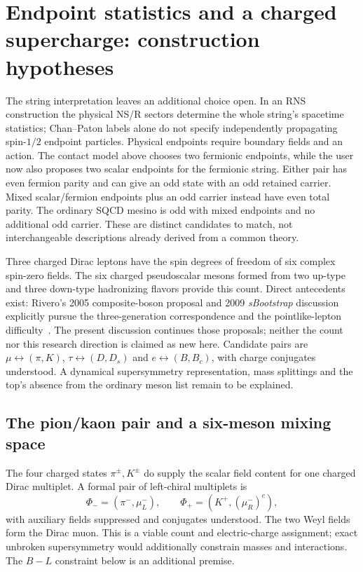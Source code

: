 \section{Endpoint statistics and a charged supercharge: construction hypotheses}
\label{sec:susy-dictionary}
The string interpretation leaves an additional choice open. In an RNS
construction the physical NS/R sectors determine the whole string's spacetime
statistics; Chan--Paton labels alone do not specify independently propagating
spin-$1/2$ endpoint particles. Physical endpoints require boundary fields and
an action. The contact model above chooses two fermionic endpoints, while the
user now also proposes two scalar endpoints for the fermionic string. Either
pair has even fermion parity and can give an odd state with an odd retained
carrier. Mixed scalar/fermion endpoints plus an odd carrier instead have even
total parity. The ordinary SQCD mesino is odd with mixed endpoints and no
additional odd carrier. These are distinct candidates to match, not
interchangeable descriptions already derived from a common theory.

Three charged Dirac leptons have the spin degrees of freedom of six complex
spin-zero fields. The six charged pseudoscalar mesons formed from two up-type
and three down-type hadronizing flavors provide this count. Direct antecedents
exist: Rivero's 2005 composite-boson proposal and 2009 \emph{sBootstrap}
discussion explicitly pursue the three-generation correspondence and the
pointlike-lepton difficulty~\cite{Rivero2005,Rivero2009}. The present discussion
continues those proposals; neither the count nor this research direction is
claimed as new here. Candidate pairs are
$\mu\leftrightarrow(\pi,K)$, $\tau\leftrightarrow(D,D_s)$ and
$e\leftrightarrow(B,B_c)$, with charge conjugates understood. A dynamical
supersymmetry representation, mass splittings and the top's absence from the
ordinary meson list remain to be explained.

\subsection{The pion/kaon pair and a six-meson mixing space}
The four charged states $\pi^\pm,K^\pm$ do supply the scalar field content
for one charged Dirac multiplet. A formal pair of left-chiral multiplets is
\begin{equation}
 \Phi_-=(\pi^-,\mu_L^-),\qquad
 \Phi_+=(K^+,(\mu_R^-)^c),
\end{equation}
with auxiliary fields suppressed and conjugates understood. The two Weyl
fields form the Dirac muon. This is a viable count and electric-charge
assignment; exact unbroken supersymmetry would additionally constrain masses
and interactions. The $B-L$ constraint below is an additional premise.

